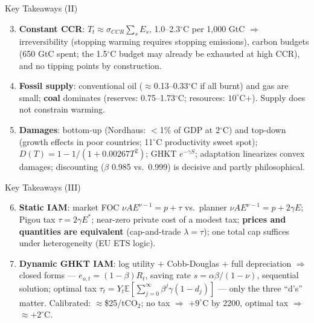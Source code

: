 \documentclass[blue]{beamer}
\newcommand{\E}{\mathbb{E}}
\begin{document}
\begin{frame}{Key Takeaways (II)}
\begin{enumerate}
    \setcounter{enumi}{2}
    \item \textbf{Constant CCR}: $T_t \approx \sigma_{CCR}\sum_s E_s$, 1.0--2.3$^{\circ}$C per 1,000 GtC $\Rightarrow$ irreversibility (stopping warming requires stopping emissions), carbon budgets (650 GtC spent; the 1.5$^{\circ}$C budget may already be exhausted at high CCR), and no tipping points by construction.

    \item \textbf{Fossil supply}: conventional oil ($\approx$0.13--0.33$^{\circ}$C if all burnt) and gas are small; \textbf{coal} dominates (reserves: 0.75--1.73$^{\circ}$C; resources: $10^{\circ}$C+). Supply does not constrain warming.

    \item \textbf{Damages}: bottom-up (Nordhaus: $<$1\% of GDP at 2$^{\circ}$C) and top-down (growth effects in poor countries; 11$^{\circ}$C productivity sweet spot); $D(T) = 1 - 1/(1+0.00267T^2)$; GHKT $e^{-\gamma S}$; adaptation linearizes convex damages; discounting ($\beta$ 0.985 vs.\ 0.999) is decisive and partly philosophical.
\end{enumerate}
\end{frame}

\begin{frame}{Key Takeaways (III)}
\footnotesize
\begin{enumerate}
    \setcounter{enumi}{5}
    \item \textbf{Static IAM}: market FOC $\nu AE^{\nu-1} = p + \tau$ vs.\ planner $\nu AE^{\nu-1} = p + 2\gamma E$; Pigou tax $\tau = 2\gamma E^*$; near-zero private cost of a modest tax; \textbf{prices and quantities are equivalent} (cap-and-trade $\lambda = \tau$); one total cap suffices under heterogeneity (EU ETS logic).

    \item \textbf{Dynamic GHKT IAM}: log utility $+$ Cobb-Douglas $+$ full depreciation $\Rightarrow$ closed forms --- $e_{o,t} = (1-\beta)R_t$, saving rate $s = \alpha\beta/(1-\nu)$, sequential solution; optimal tax $\tau_t = Y_t\E\left[\sum_{j=0}^{\infty}\beta^j\gamma(1-d_j)\right]$ --- only the three ``d's'' matter. Calibrated: $\approx$\$25/tCO$_2$; no tax $\Rightarrow$ $+9^{\circ}$C by 2200, optimal tax $\Rightarrow$ $\approx+2^{\circ}$C.

\end{enumerate}
\end{frame}
\end{document}
